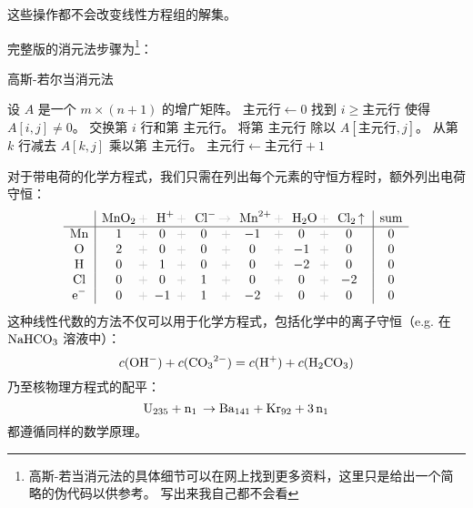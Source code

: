 \documentclass{ctexart}
\newcommand{\grayplus}{\,\color{lightgray}+\,}
\newcommand{\grayto}{\,\color{lightgray}\to\,}
\begin{document}
这些操作都不会改变线性方程组的解集。

完整版的消元法步骤为\footnote{高斯-若当消元法的具体细节可以在网上找到更多资料，这里只是给出一个简略的伪代码以供参考。
写出来我自己都不会看}：

\begin{algorithm}[H]
    \caption{高斯-若尔当消元法}
    \label{alg:gauss-jordan}
    \begin{algorithmic}[1]
        \State 设 \(A\) 是一个 \(m \times (n+1)\) 的增广矩阵。
        \State \( \text{主元行} \leftarrow 0 \)
          
        \State 找到 \(i \ge \text{主元行}\) 使得 \(A[i, j] \ne 0\)。
        \State 交换第 \(i\) 行和第 \(\text{主元行}\)。
        \State 将第 \(\text{主元行}\) 除以
        \(A[\text{主元行}, j]\)。 
         
        \State 从第 \(k\) 行减去 \(A[k, j]\) 乘以第 \(\text{主元行}\)。
        \EndIf
        \EndFor
        \State \( \text{主元行} \leftarrow \text{主元行} + 1 \)
        \EndIf
        \EndFor
    \end{algorithmic}
\end{algorithm}

对于带电荷的化学方程式，我们只需在列出每个元素的守恒方程时，额外列出电荷守恒：
\[
    \begin{array}{c|*{5}{c@{\grayplus}}c|c}
        & \multicolumn{1}{c@{\grayplus}}{\ce{MnO2}} &
        \multicolumn{1}{c@{\grayplus}}{\ce{H+}} &
        \multicolumn{1}{c@{\grayto}}{\ce{Cl-}} &
        \multicolumn{1}{c@{\grayplus}}{\ce{Mn^2+}} &
        \multicolumn{1}{c@{\grayplus}}{\ce{H2O}} &
        \multicolumn{1}{c|}{\ce{Cl2 ^}} & \text{sum} \\
        \hline
        \ce{Mn} & 1 & 0 & 0 & -1 & 0 & 0 & 0\\
        \ce{O} & 2 & 0 & 0 & 0 & -1 & 0 & 0\\
        \ce{H} & 0 & 1 & 0 & 0 & -2 & 0 & 0\\
        \ce{Cl} & 0 & 0 & 1 & 0 & 0 & -2 & 0\\
        \ce{e^-} & 0 & -1 & 1 & -2 & 0 & 0 & 0\\
    \end{array}
\]
这种线性代数的方法不仅可以用于化学方程式，包括化学中的离子守恒（e.g. 在\(\ce{NaHCO3}\) 溶液中）：
\[
    c(\ce{OH^-}) + c(\ce{CO3^{2-}}) = c(\ce{H^+}) + c(\ce{H2CO3})
\]
乃至核物理方程式的配平：\[
    \ce{U235 + n1 \to Ba141 + Kr92 + 3n1}
\]
都遵循同样的数学原理。
\end{document}

